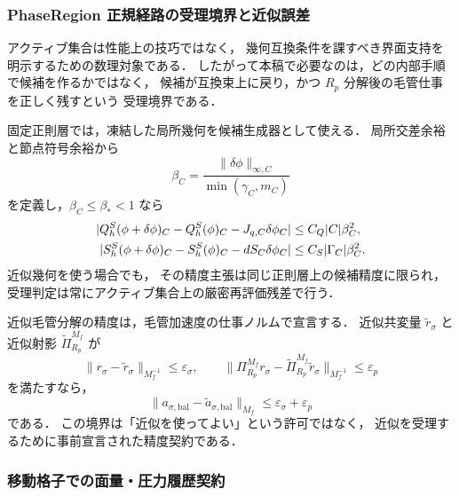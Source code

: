 \subsubsection{PhaseRegion 正規経路の受理境界と近似誤差}
\label{sec:ao_fast_acceleration}

アクティブ集合は性能上の技巧ではなく，
幾何互換条件を課すべき界面支持を明示するための数理対象である．
したがって本稿で必要なのは，どの内部手順で候補を作るかではなく，
候補が互換束上に戻り，かつ $R_p$ 分解後の毛管仕事を正しく残すという
受理境界である．

固定正則層では，凍結した局所幾何を候補生成器として使える．
局所交差余裕と節点符号余裕から
\begin{equation}
  \beta_C
  =
  \frac{\|\delta\phi\|_{\infty,C}}
       {\min(\gamma_C,m_C)}
  \label{eq:ao_beta_margin}
\end{equation}
を定義し，$\beta_C\le\beta_\ast<1$ なら
\begin{align}
  |Q_h^S(\phi+\delta\phi)_C-Q_h^S(\phi)_C-J_{q,C}\delta\phi_C|
  &\le C_Q |C|\beta_C^2, \notag\\
  |S_h^S(\phi+\delta\phi)_C-S_h^S(\phi)_C-dS_C\delta\phi_C|
  &\le C_S |\Gamma_C|\beta_C^2 .
  \label{eq:ao_fixed_stratum_accuracy}
\end{align}
近似幾何を使う場合でも，
その精度主張は同じ正則層上の候補精度に限られ，
受理判定は常にアクティブ集合上の厳密再評価残差で行う．

近似毛管分解の精度は，毛管加速度の仕事ノルムで宣言する．
近似共変量 $\widetilde r_\sigma$ と近似射影
$\widetilde\Pi_{R_p}^{M_f}$ が
\begin{equation}
  \|r_\sigma-\widetilde r_\sigma\|_{M_f^{-1}}\le\varepsilon_\sigma,\qquad
  \|\Pi_{R_p}^{M_f}r_\sigma-\widetilde\Pi_{R_p}^{M_f}\widetilde r_\sigma\|_{M_f^{-1}}
  \le\varepsilon_p
  \label{eq:ao_fast_error_budget}
\end{equation}
を満たすなら，
\begin{equation}
  \|a_{\sigma,\mathrm{bal}}-\widetilde a_{\sigma,\mathrm{bal}}\|_{M_f}
  \le \varepsilon_\sigma+\varepsilon_p
  \label{eq:ao_fast_acceleration_error_bound}
\end{equation}
である．
この境界は「近似を使ってよい」という許可ではなく，
近似を受理するために事前宣言された精度契約である．

\subsubsection{移動格子での面量・圧力履歴契約}
\label{sec:ao_moving_grid_contract}

